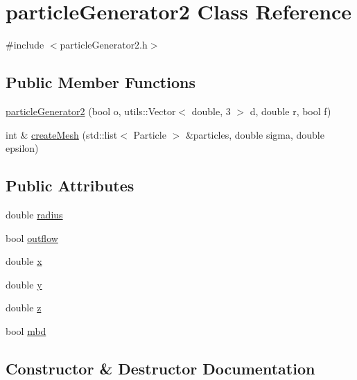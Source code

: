 \hypertarget{classparticle_generator2}{}\section{particle\+Generator2 Class Reference}
\label{classparticle_generator2}


{\ttfamily \#include $<$particle\+Generator2.\+h$>$}

\subsection*{Public Member Functions}
\begin{DoxyCompactItemize}
\item 
\mbox{\hyperlink{classparticle_generator2_a1a1909e3af6ad6b8e3b7a1dc6bfeb201}{particle\+Generator2}} (bool o, utils\+::\+Vector$<$ double, 3 $>$ d, double r, bool f)
\item 
int \& \mbox{\hyperlink{classparticle_generator2_a6f52594c50e9b4d40f6641bf79539476}{create\+Mesh}} (std\+::list$<$ Particle $>$ \&particles, double sigma, double epsilon)
\end{DoxyCompactItemize}
\subsection*{Public Attributes}
\begin{DoxyCompactItemize}
\item 
double \mbox{\hyperlink{classparticle_generator2_abfcd95d4210dfc36b18de468bb65293c}{radius}}
\item 
bool \mbox{\hyperlink{classparticle_generator2_a943e9f09126b5ce9ad13ef102fec8801}{outflow}}
\item 
double \mbox{\hyperlink{classparticle_generator2_a98dff9bc126027bc1720259427b453d5}{x}}
\item 
double \mbox{\hyperlink{classparticle_generator2_a05750f354589de71bb15c6f060145a99}{y}}
\item 
double \mbox{\hyperlink{classparticle_generator2_a3eec5d7fc847bac45ec9daf44363b462}{z}}
\item 
bool \mbox{\hyperlink{classparticle_generator2_a121ae00704e381b240f3d850a85bf1ac}{mbd}}
\end{DoxyCompactItemize}


\subsection{Constructor \& Destructor Documentation}
\mbox{\label{classparticle_generator2_a1a1909e3af6ad6b8e3b7a1dc6bfeb201}} 

